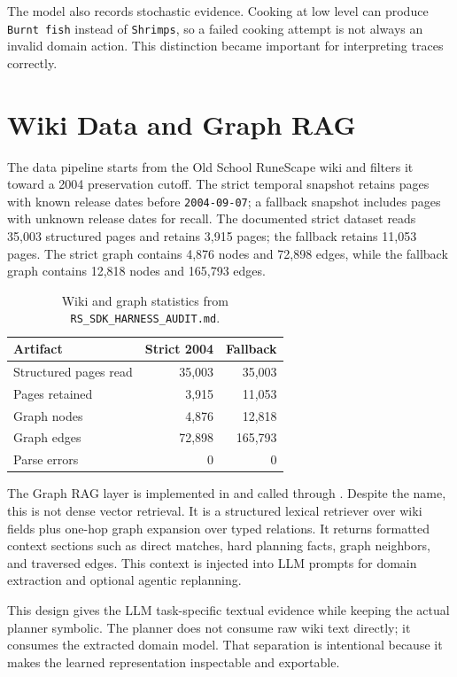 \documentclass[10pt,twocolumn,letterpaper]{article}
\begin{document}
The model also records stochastic evidence. Cooking at low level can produce \texttt{Burnt fish} instead of \texttt{Shrimps}, so a failed cooking attempt is not always an invalid domain action. This distinction became important for interpreting traces correctly.

\section{Wiki Data and Graph RAG}

The data pipeline starts from the Old School RuneScape wiki and filters it toward a 2004 preservation cutoff. The strict temporal snapshot retains pages with known release dates before \texttt{2004-09-07}; a fallback snapshot includes pages with unknown release dates for recall. The documented strict dataset reads 35,003 structured pages and retains 3,915 pages; the fallback retains 11,053 pages. The strict graph contains 4,876 nodes and 72,898 edges, while the fallback graph contains 12,818 nodes and 165,793 edges.

\begin{table}[t]
\centering
\small
\begin{tabular}{lrr}
\toprule
\textbf{Artifact} & \textbf{Strict 2004} & \textbf{Fallback} \\
\midrule
Structured pages read & 35,003 & 35,003 \\
Pages retained & 3,915 & 11,053 \\
Graph nodes & 4,876 & 12,818 \\
Graph edges & 72,898 & 165,793 \\
Parse errors & 0 & 0 \\
\bottomrule
\end{tabular}
\caption{Wiki and graph statistics from \texttt{RS\_SDK\_HARNESS\_AUDIT.md}.}
\label{tab:wiki-stats}
\end{table}

The Graph RAG layer is implemented in  and called through . Despite the name, this is not dense vector retrieval. It is a structured lexical retriever over wiki fields plus one-hop graph expansion over typed relations. It returns formatted context sections such as direct matches, hard planning facts, graph neighbors, and traversed edges. This context is injected into LLM prompts for domain extraction and optional agentic replanning.

This design gives the LLM task-specific textual evidence while keeping the actual planner symbolic. The planner does not consume raw wiki text directly; it consumes the extracted domain model. That separation is intentional because it makes the learned representation inspectable and exportable.
\end{document}
